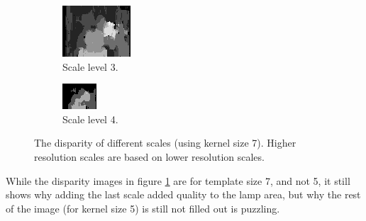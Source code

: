 \documentclass[12pt,a4paper,oneside,final]{article}
\begin{document}
{\begin{figure}[H]
\begin{subfigure}[b]{0.24\textwidth}
			\includegraphics[width=\textwidth]{disparity3set_1.png}
			\caption{Scale level 3.}
		\end{subfigure}
		\begin{subfigure}[b]{0.24\textwidth}
			\includegraphics[width=\textwidth]{disparity4set_1.png}
			\caption{Scale level 4.}
		\end{subfigure}
		\caption{The disparity of different scales (using kernel size 7). Higher resolution scales are based on lower resolution scales.}
		\label{fig:lowlevel}
	\end{figure}
	While the disparity images in figure \ref{fig:lowlevel} are for template size 7, and not 5, it still shows why adding the last scale added quality to the lamp area, but why the rest of the image (for kernel size 5) is still not filled out is puzzling.}
\fi

\end{document}
